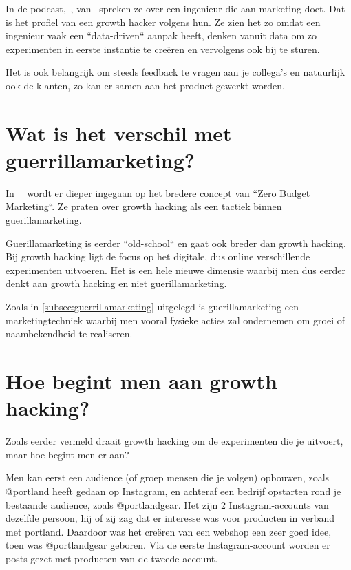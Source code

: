 In de podcast,~, van~\autocite{fizzle.co2015} spreken ze over een ingenieur die aan marketing doet. Dat is het profiel van een growth hacker volgens hun. Ze zien het zo omdat een ingenieur vaak een ``data-driven`` aanpak heeft, denken vanuit data om zo experimenten in eerste instantie te creëren en vervolgens ook bij te sturen. 

Het is ook belangrijk om steeds feedback te vragen aan je collega's en natuurlijk ook de klanten, zo kan er samen aan het product gewerkt worden.

\section{Wat is het verschil met guerrillamarketing?} \label{sec:verschil-met-guerrillamarketing}

In~~\autocite{fizzle.co2015} wordt er dieper ingegaan op het bredere concept van ``Zero Budget Marketing``. Ze praten over growth hacking als een tactiek binnen guerillamarketing. 

Guerillamarketing is eerder ``old-school`` en gaat ook breder dan growth hacking. Bij growth hacking ligt de focus op het digitale, dus online verschillende experimenten uitvoeren. Het is een hele nieuwe dimensie waarbij men dus eerder denkt aan growth hacking en niet guerillamarketing.

Zoals in \ref{subsec:guerrillamarketing} uitgelegd is guerillamarketing een marketingtechniek waarbij men vooral fysieke acties zal ondernemen om groei of naambekendheid te realiseren. 

\section{Hoe begint men aan growth hacking?} \label{sec:hoe-growth-hacking}
 
Zoals eerder vermeld draait growth hacking om de experimenten die je uitvoert, maar hoe begint men er aan?

Men kan eerst een audience (of groep mensen die je volgen) opbouwen, zoals @portland heeft gedaan op Instagram, en achteraf een bedrijf opstarten rond je bestaande audience, zoals @portlandgear. Het zijn 2 Instagram-accounts van dezelfde persoon, hij of zij zag dat er interesse was voor producten in verband met portland. Daardoor was het creëren van een webshop een zeer goed idee, toen was @portlandgear geboren. Via de eerste Instagram-account worden er posts gezet met producten van de tweede account.

